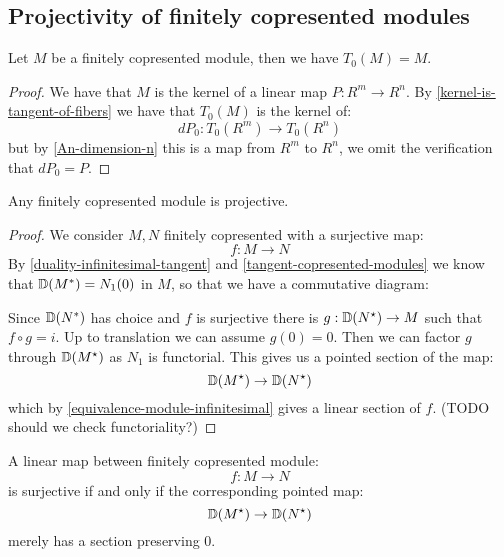\subsection{Projectivity of finitely copresented modules}

\begin{lemma}\label{tangent-copresented-modules}
Let $M$ be a finitely copresented module, then we have $T_0(M) = M$.
\end{lemma}

\begin{proof}
We have that $M$ is the kernel of a linear map $P:R^m\to R^n$. By \cref{kernel-is-tangent-of-fibers} we have that $T_0(M)$ is the kernel of:
\[dP_0:T_0(R^m)\to T_0(R^n)\]
but by \cref{An-dimension-n} this is a map from $R^m$ to $R^n$, we omit the verification that $dP_0 = P$.
\end{proof}

\begin{lemma}
Any finitely copresented module is projective.
\end{lemma}

\begin{proof}
We consider $M,N$ finitely copresented with a surjective map:
\[f:M\to N\]
By \cref{duality-infinitesimal-tangent} and \cref{tangent-copresented-modules} we know that $\mathbb{D}(M^*) = N_1(0)$ in $M$, so that we have a commutative diagram:
\begin{center}
\end{center}
Since $\mathbb{D}(N^*)$ has choice and $f$ is surjective there is $g:\mathbb{D}(N^\star)\to M$ such that $f\circ g = i$. Up to translation we can assume $g(0) = 0$.
Then we can factor $g$ through $\mathbb{D}(M^\star)$ as $N_1$ is functorial. This gives us a pointed section of the map:
\[\mathbb{D}(M^\star) \to \mathbb{D}(N^\star)\]
which by \cref{equivalence-module-infinitesimal} gives a linear section of $f$. (TODO should we check functoriality?)
\end{proof}

\begin{lemma}\label{neighborhood-tangent-correspondence-smooth}
A linear map between finitely copresented module:
\[f:M\to N\]
is surjective if and only if the corresponding pointed map:
\[\mathbb{D}(M^\star) \to \mathbb{D}(N^\star)\]
merely has a section preserving $0$.
\end{lemma}

